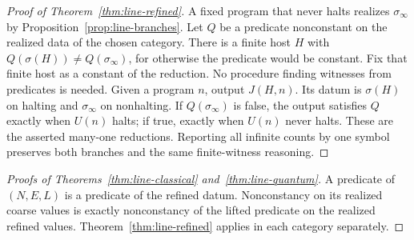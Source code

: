 \begin{proof}[Proof of Theorem~\ref{thm:line-refined}]
A fixed program that never halts realizes $\sigma_\infty$ by
Proposition~\ref{prop:line-branches}. Let $Q$ be a predicate nonconstant
on the realized data of the chosen category. There is a finite host
$H$ with $Q(\sigma(H))\ne Q(\sigma_\infty)$, for otherwise the predicate
would be constant. Fix that finite host as a constant of the reduction.
No procedure finding witnesses from predicates is needed.
Given a program $n$, output $J(H,n)$. Its datum is $\sigma(H)$ on
halting and $\sigma_\infty$ on nonhalting. If $Q(\sigma_\infty)$ is
false, the output satisfies $Q$ exactly when $U(n)$ halts; if true,
exactly when $U(n)$ never halts. These are the asserted many-one
reductions. Reporting all infinite counts by one symbol preserves
both branches and the same finite-witness reasoning.
\end{proof}
\begin{proof}[Proofs of Theorems~\ref{thm:line-classical} and~\ref{thm:line-quantum}]
A predicate of $(N,E,L)$ is a predicate of the refined datum.
Nonconstancy on its realized coarse values is exactly nonconstancy
of the lifted predicate on the realized refined values.
Theorem~\ref{thm:line-refined} applies in each category separately.
\end{proof}

